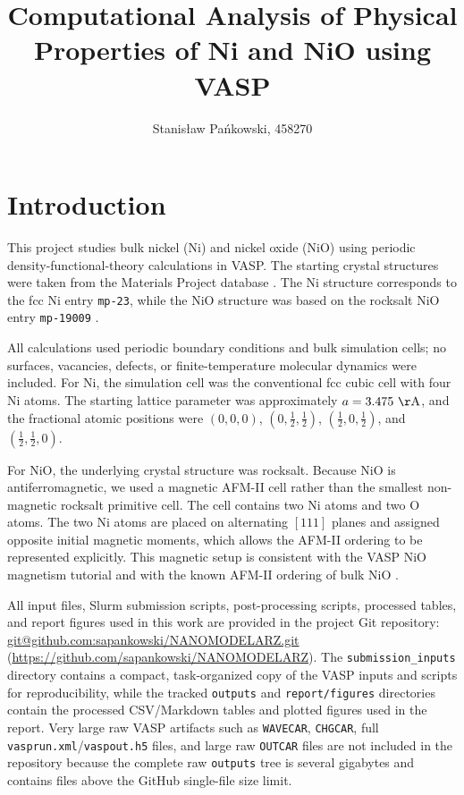 \documentclass[12pt,a4paper]{article}
\title{Computational Analysis of Physical Properties of Ni and NiO using VASP}
\author{Stanisław Pańkowski, 458270}
\date{}
\begin{document}
\maketitle
\tableofcontents
\newpage

\section{Introduction}

This project studies bulk nickel (Ni) and nickel oxide (NiO) using periodic
density-functional-theory calculations in VASP.  The starting crystal
structures were taken from the Materials Project database
\cite{materials-project}.  The Ni structure corresponds to the fcc Ni entry
\texttt{mp-23}, while the NiO structure was based on the rocksalt NiO entry
\texttt{mp-19009} \cite{mp-ni,mp-nio}.

All calculations used periodic boundary conditions and bulk simulation cells;
no surfaces, vacancies, defects, or finite-temperature molecular dynamics were
included.  For Ni, the simulation cell was the conventional fcc cubic cell with
four Ni atoms.  The starting lattice parameter was approximately
\(a = 3.475~\mathrm{\AA}\), and the fractional atomic positions were
\((0,0,0)\), \((0,\frac{1}{2},\frac{1}{2})\),
\((\frac{1}{2},0,\frac{1}{2})\), and
\((\frac{1}{2},\frac{1}{2},0)\).

For NiO, the underlying crystal structure was rocksalt.  Because NiO is
antiferromagnetic, we used a magnetic AFM-II cell rather than the smallest
non-magnetic rocksalt primitive cell.  The cell contains two Ni atoms and two O
atoms.  The two Ni atoms are placed on alternating \([111]\) planes and assigned
opposite initial magnetic moments, which allows the AFM-II ordering to be
represented explicitly.  This magnetic setup is consistent with the VASP NiO
magnetism tutorial and with the known AFM-II ordering of bulk NiO
\cite{vasp-nio-magnetism}.

All input files, Slurm submission scripts, post-processing scripts, processed
tables, and report figures used in this work are provided in the project Git
repository: \url{git@github.com:sapankowski/NANOMODELARZ.git}
(\url{https://github.com/sapankowski/NANOMODELARZ}).  The
\texttt{submission\_inputs} directory contains a compact, task-organized copy
of the VASP inputs and scripts for reproducibility, while the tracked
\texttt{outputs} and \texttt{report/figures} directories contain the processed
CSV/Markdown tables and plotted figures used in the report.  Very large raw
VASP artifacts such as \texttt{WAVECAR}, \texttt{CHGCAR}, full
\texttt{vasprun.xml}/\texttt{vaspout.h5} files, and large raw \texttt{OUTCAR}
files are not included in the repository because the complete raw
\texttt{outputs} tree is several gigabytes and contains files above the GitHub
single-file size limit.
\end{document}
